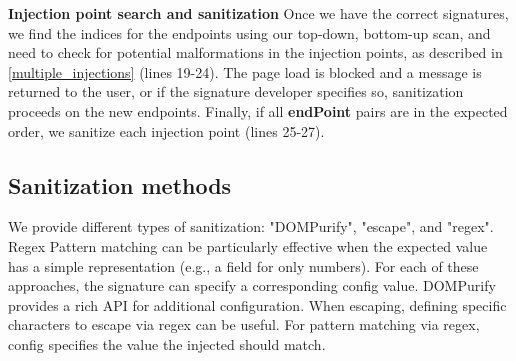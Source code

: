 \textbf{Injection point search and sanitization}
Once we have the correct signatures, we find the indices for the endpoints using our top-down, bottom-up scan, and need to check for potential malformations in the injection points, as described in \autoref{multiple_injections} (lines 19-24). The page load is blocked and a message is returned to the user, or if the signature developer specifies so, sanitization proceeds on the new endpoints. Finally, if all \textbf{endPoint} pairs are in the expected order, we sanitize each injection point (lines 25-27).

\subsection{Sanitization methods}
We provide different types of sanitization: "DOMPurify", "escape", and "regex". Regex Pattern matching can be particularly effective when the expected value has a simple representation (e.g., a field for only numbers). For each of these approaches, the signature can specify a corresponding config value. DOMPurify provides a rich API for additional configuration. When escaping, defining specific characters to escape via regex can be useful. For pattern matching via regex, config specifies the value the injected should match.
